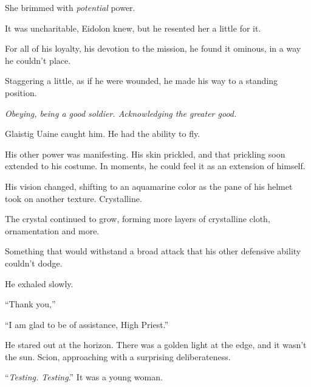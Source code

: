 She brimmed with \emph{potential} power.



It was uncharitable, Eidolon knew, but he resented her a little for it.



For all of his loyalty, his devotion to the mission, he found it ominous, in a way he couldn't place.



Staggering a little, as if he were wounded, he made his way to a standing position.



\emph{Obeying, being a good soldier.  Acknowledging the greater good.}



\sectionbreak






Glaistig Uaine caught him.  He had the ability to fly.



His other power was manifesting.  His skin prickled, and that prickling soon extended to his costume.  In moments, he could feel it as an extension of himself.



His vision changed, shifting to an aquamarine color as the pane of his helmet took on another texture.  Crystalline.



The crystal continued to grow, forming more layers of crystalline cloth, ornamentation and more.



Something that would withstand a broad attack that his other defensive ability couldn't dodge.



He exhaled slowly.



``Thank you,''



``I am glad to be of assistance, High Priest.''



He stared out at the horizon.  There was a golden light at the edge, and it wasn't the sun.  Scion, approaching with a surprising deliberateness.



``\emph{Testing.  Testing}.''  It was a young woman.




